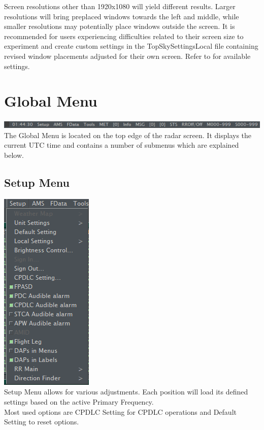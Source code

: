 \documentclass[11pt,a4paper,oldfontcommands]{memoir}
\begin{document}
Screen resolutions other than 1920x1080 will yield different results. Larger resolutions will bring preplaced windows towards the left and middle, while smaller resolutions may potentially place windows outside the screen. It is recommended for users experiencing difficulties related to their screen size to experiment and create custom settings in the TopSkySettingsLocal file containing revised window placements adjusted for their own screen. Refer to \texttt{} for available settings.\\

\section{Global Menu}
\includegraphics{img/globalmenu.png}\\
The Global Menu is located on the top edge of the radar screen. It displays the current UTC time and contains a number of submenus which are explained below.

\subsection{Setup Menu}
\includegraphics{img/Setup.png}\\
Setup Menu allows for various adjustments. Each position will load its defined settings based on the active Primary Frequency.\\ 
Most used options are CPDLC Setting for CPDLC operations and Default Setting to reset options.\\
\end{document}
